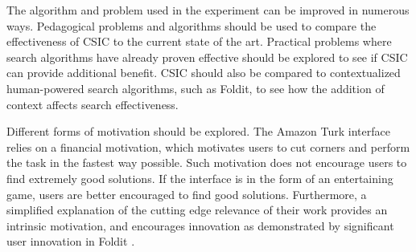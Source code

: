 The algorithm and problem used in the experiment can be improved in numerous ways.  Pedagogical problems and algorithms should be used to compare the effectiveness of CSIC to the current state of the art.  Practical problems where search algorithms have already proven effective should be explored to see if CSIC can provide additional benefit.  CSIC should also be compared to contextualized human-powered search algorithms, such as Foldit, to see how the addition of context affects search effectiveness.  

Different forms of motivation should be explored.  The Amazon Turk interface relies on a financial motivation, which motivates users to cut corners and perform the task in the fastest way possible.  Such motivation does not encourage users to find extremely good solutions.  If the interface is in the form of an entertaining game, users are better encouraged to find good solutions.  Furthermore, a simplified explanation of the cutting edge relevance of their work provides an intrinsic motivation, and encourages innovation as demonstrated by significant user innovation in Foldit \citep{moore12:_foldit_game_leads_to_aids_resear_break}.

